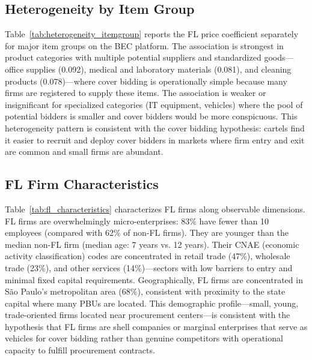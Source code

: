 

\subsection{Heterogeneity by Item Group}

Table~\ref{tab:heterogeneity_itemgroup} reports the FL price coefficient separately for major item groups on the BEC platform. The association is strongest in product categories with multiple potential suppliers and standardized goods---office supplies (0.092), medical and laboratory materials (0.081), and cleaning products (0.078)---where cover bidding is operationally simple because many firms are registered to supply these items. The association is weaker or insignificant for specialized categories (IT equipment, vehicles) where the pool of potential bidders is smaller and cover bidders would be more conspicuous. This heterogeneity pattern is consistent with the cover bidding hypothesis: cartels find it easier to recruit and deploy cover bidders in markets where firm entry and exit are common and small firms are abundant.



\subsection{FL Firm Characteristics}

Table~\ref{tab:fl_characteristics} characterizes FL firms along observable dimensions. FL firms are overwhelmingly micro-enterprises: 83\% have fewer than 10 employees (compared with 62\% of non-FL firms). They are younger than the median non-FL firm (median age: 7 years vs. 12 years). Their CNAE (economic activity classification) codes are concentrated in retail trade (47\%), wholesale trade (23\%), and other services (14\%)---sectors with low barriers to entry and minimal fixed capital requirements. Geographically, FL firms are concentrated in S\~{a}o Paulo's metropolitan area (68\%), consistent with proximity to the state capital where many PBUs are located. This demographic profile---small, young, trade-oriented firms located near procurement centers---is consistent with the hypothesis that FL firms are shell companies or marginal enterprises that serve as vehicles for cover bidding rather than genuine competitors with operational capacity to fulfill procurement contracts.


